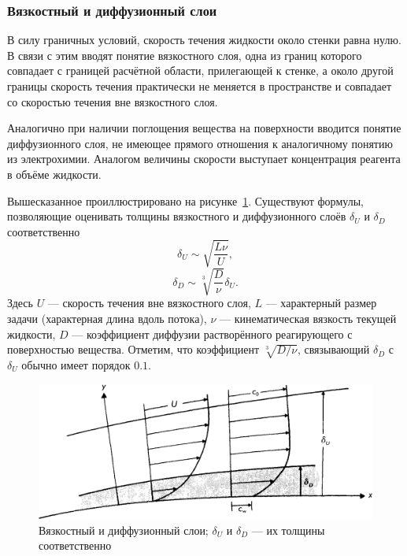 \documentclass[oneside,final,12pt]{extreport}
\begin{document}
\subsubsection*{Вязкостный и диффузионный слои}
В силу граничных условий, скорость течения жидкости около стенки равна нулю.
В связи с этим вводят понятие вязкостного слоя, одна из границ которого
совпадает с границей расчётной области, прилегающей к стенке,
а около другой границы скорость течения практически не меняется в пространстве
и совпадает со скоростью течения вне вязкостного слоя.

Аналогично при наличии поглощения вещества на поверхности вводится понятие
диффузионного слоя, не имеющее прямого отношения к аналогичному понятию из
электрохимии.
Аналогом величины скорости выступает концентрация реагента в объёме жидкости.

Вышесказанное проиллюстрировано на рисунке~\ref{fig:visc_diff_layers}.
Существуют формулы, позволяющие оценивать толщины вязкостного и диффузионного
слоёв $\delta_U$ и $\delta_D$ соответственно\cite{bib:ll,bib:phys_chem_hydro_layers}
\begin{equation}
  \delta_U \sim \sqrt{\frac{L\nu}{U}},
\label{eq:viscous_layer}
\end{equation}
\begin{equation}
  \delta_D \sim \sqrt[3]{\frac{D}{\nu}} \delta_U.
\label{eq:diffusion_layer}
\end{equation}
Здесь $U$ --- скорость течения вне вязкостного слоя,
$L$ --- характерный размер задачи (характерная длина вдоль потока),
$\nu$ --- кинематическая вязкость текущей жидкости,
$D$ --- коэффициент диффузии растворённого реагирующего с поверхностью вещества.
Отметим, что коэффициент $\sqrt[3]{D/\nu}$, связывающий $\delta_D$ с $\delta_U$
обычно имеет порядок $0.1$.


\begin{figure}
  \centering
  \includegraphics[width=.7\textwidth]{pic/visc_diff_layers}
  \caption{\label{fig:visc_diff_layers}%
    Вязкостный и диффузионный слои;
    $\delta_U$ и $\delta_D$ --- их толщины соответственно
  }

\end{figure}
\end{document}
